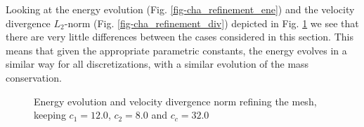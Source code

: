 Looking at the energy evolution (Fig. \ref{fig-cha_refinement_ene}) and the velocity divergence $L_2$-norm (Fig. \ref{fig-cha_refinement_div}) depicted in Fig. \ref{fig-cha_refinement} we see that there are very little differences between the cases considered in this section. This means that given the appropriate parametric constants, the energy evolves in a similar way for all discretizations, with a similar evolution of the mass conservation. 
\begin{figure}[h!]
  \centering
  \caption{Energy evolution and velocity divergence norm refining the mesh, keeping $c_1=12.0$, $c_2=8.0$ and $c_c=32.0$}
  \label{fig-cha_refinement}
\end{figure}

